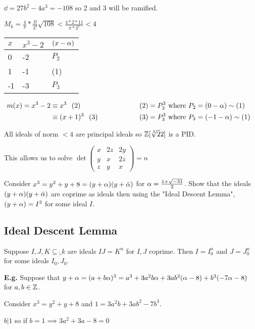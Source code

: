 \documentclass[11pt]{article}
\begin{document}
$\dd = 27b^2 - 4a^3 = -108 $ so 2 and 3 will be ramified.
\spa

$M_k = \frac4\pi * \frac{3!}{3^3} \sqrt{108} < \frac{4*2*11}{\pi *3^2} < 4$
\spac

\begin{tabular}{l|l|l}
	$x$ & $x^3 - 2$ & $(x-\alpha)$ \\ \hline
	0   & -2        & $P_2$    \\
	1   & -1        & (1)      \\
	-1  & -3        & $P_3$   
\end{tabular}

\begin{align*}
	m(x) = x^3 - 2 &\equiv x^3 \hspace{7pt} (2) \hspace{50pt} & (2) &= P_2^3 \text{ where } P_2 = (0 - \alpha) \sim (1) \\
	&\equiv (x+1)^3 \hspace{7pt} (3)  \hspace{50pt} & (3) &= P_3^3 \text{ where } P_3 = (-1-\alpha) \sim (1)
\end{align*}

All ideals of norm $<4$ are principal ideals so $\mathbb{Z}[\sqrt[3]{2}2] $ is a PID.

This allows us to solve $\det \begin{pmatrix}
	x & 2z & 2y\\
	y & x & 2z \\
	z & y & x
\end{pmatrix} = n$


Consider $x^3 = y^2 + y+8 = (y + \alpha) (y + \bar {\alpha})$ for $\alpha =\frac{1+\sqrt{-31}}2$. 
Show that the ideals $(y+ \alpha) (y+\bar {\alpha})$ are coprime as ideals then using the "Ideal Descent Lemma", $ (y+\alpha) = I^3$ for some ideal $I$.
\spa
\subsection{Ideal Descent Lemma}
\begin{lemma} 
Suppose $I,J, K \subseteq \ring_k$ are ideals $IJ= K^n$ for $I,J$ coprime.
	Then $I= I_0^n $ and $J=J_0^n$ for some ideals $I_0, J_0$.
\end{lemma}
\spa
\textbf{E.g.} Suppose that $y+\alpha = (a+b\alpha)^3 = a^3 + 3a^2b\alpha + 3ab^2(\alpha-8) + b^3(-7\alpha - 8)$  for $a,b \in \mathbb{Z}$.
\spa

Consider $x^3 = y^2 + y +8$ and $ 1 = 3a^2b + 3ab^2 -7b^3$.
\spa

$b | 1$ so if $b=1 \implies 3a^2 + 3a-8 = 0$ \lightning
\spa
\end{document}
